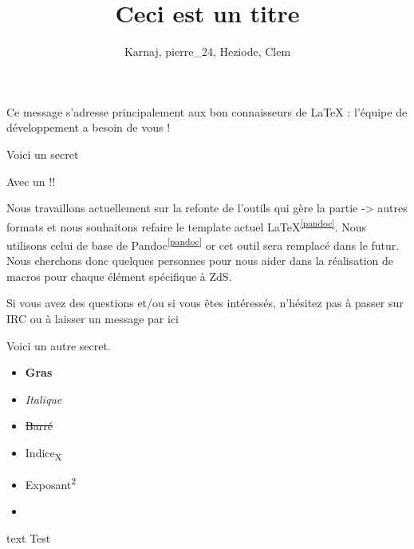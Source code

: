 \documentclass[small]{zmdocument}
\title{Ceci est un titre}
\author{Karnaj, pierre\_24, Heziode, Clem}
\begin{document}
\maketitle
\tableofcontents
\newpage

\levelOneIntroduction

Ce message s’adresse principalement aux bon connaisseurs de LaTeX : l’équipe de développement a besoin de vous ! 

\begin{Spoiler}
Voici un secret

Avec un !!
\end{Spoiler}


Nous travaillons actuellement sur la refonte de l’outils qui gère la partie  -> autres formats et nous souhaitons refaire le template actuel LaTeX\textsuperscript{\ref{pandoc}}. Nous utilisons celui de base de Pandoc\textsuperscript{\ref{pandoc}} or cet outil sera remplacé dans le futur. Nous cherchons donc quelques personnes pour nous aider dans la réalisation de macros pour chaque élément spécifique à ZdS.


Si vous avez des questions et/ou si vous êtes intéressés, n’hésitez pas à passer sur IRC ou à laisser un message par ici 

\begin{Spoiler}
Voici un autre secret.
\end{Spoiler}


\begin{itemize}
\item \textbf{Gras}
\item \textit{Italique}
\item \sout{Barré}
\item Indice\textsubscript{X}
\item Exposant\textsuperscript{2}
\item {}
\end{itemize}

\begin{Spoiler}
\begin{CodeBlock}{text}
Test
\end{CodeBlock}
\end{Spoiler}
\end{document}
